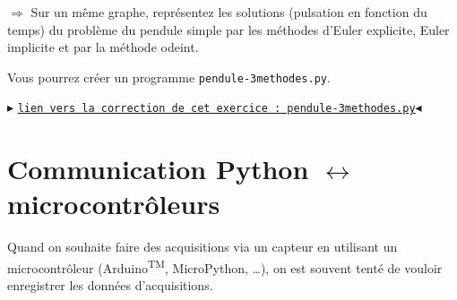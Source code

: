 \documentclass[11pt]{article}
\begin{document}
 
 $\Longrightarrow$ Sur un même graphe, représentez les solutions (pulsation en fonction du temps) du problème du pendule simple par les méthodes d'Euler explicite, Euler implicite et par la méthode odeint.
  
  
  
  

\smallskip

Vous pourrez créer un programme \texttt{pendule-3methodes.py}.

\smallskip


 
\begin{center}
$\blacktriangleright$ \href{https://github.com/formationPythonPC-Juin/corrections-formation/blob/master/pendule-3methodes.py}{\underline{\texttt{lien vers la correction de cet exercice : pendule-3methodes.py}}}$\blacktriangleleft$                                                                                                                                                                    \end{center}

 
  
 
 
 
 
 




 
 \newpage
 
 \section{Communication Python $\longleftrightarrow$ microcontrôleurs}
 
 
 Quand on souhaite faire des acquisitions via un capteur en utilisant un microcontrôleur (Arduino\textsuperscript{TM}, MicroPython, \ldots), on est souvent tenté de vouloir enregistrer les données d'acquisitions. 
 
\end{document}
